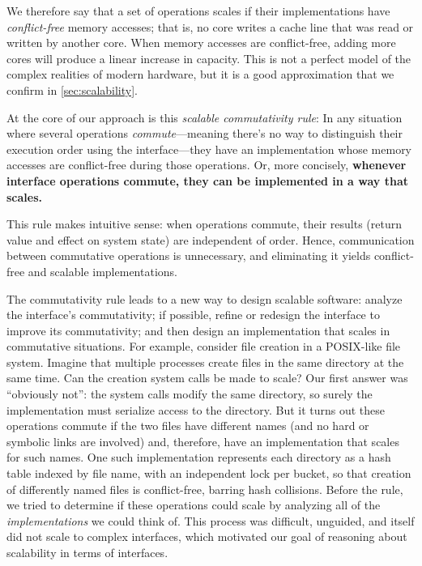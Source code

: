 We therefore say that a set of operations scales if their
implementations have \emph{conflict-free} memory accesses; that is, no
core writes a cache line that was read or written by another core.
%
When memory accesses are conflict-free, adding more cores will produce
a linear increase in capacity.
%
This is not a perfect model of the complex realities of modern
hardware, but it is a good approximation that we confirm in
\cref{sec:scalability}.

At the core of our approach is this \emph{scalable commutativity
  rule}: In any situation where several operations
\emph{commute}---meaning there's no way to distinguish their execution
order using the interface---they have an implementation whose memory
accesses are conflict-free during those operations.
%
Or, more concisely, \textbf{whenever interface operations commute,
  they can be implemented in a way that scales.}

This rule makes intuitive sense: when operations commute, their
results (return value and effect on system state) are independent of
order.  Hence, communication between commutative operations is
unnecessary, and eliminating it yields conflict-free and scalable
implementations.

The commutativity rule leads to a new way to design scalable
software:
%
analyze the interface's commutativity; if possible, refine or redesign
the interface to improve its commutativity; and then design an
implementation that scales in commutative situations.
%
For example,
consider file creation in a POSIX-like file system. Imagine that
multiple processes create files in the same directory at the same
time. Can the creation system calls be made to scale? Our
first answer was ``obviously not'': the system calls modify the same
directory, so surely the implementation must
serialize access to the directory. But it turns
out these operations commute if the two files have different names
(and no hard or symbolic links are involved) and, therefore, have an
implementation that scales for such names.
One such implementation represents each directory as a hash table
indexed by file name, with an independent lock per bucket,
so that creation of differently named files is conflict-free, barring
hash collisions.
%
Before the rule, we tried to determine if these
operations could scale by analyzing all of the \emph{implementations}
we could think
of.  This process was difficult, unguided, and itself did not scale to
complex interfaces, which
motivated our goal of reasoning about
scalability in terms of interfaces.


